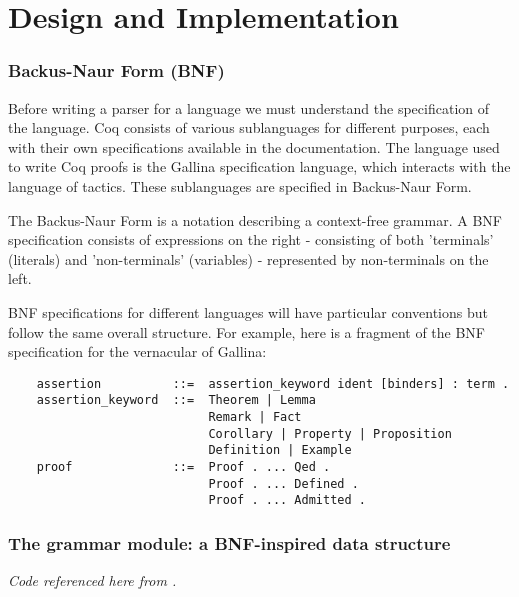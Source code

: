 \chapter{Design and Implementation} %


\label{design-and-implementation} %


\subsection{Backus-Naur Form (BNF)}

Before writing a parser for a language we must understand the specification of the language. Coq consists of various sublanguages for different purposes, each with their own specifications available in the documentation. The language used to write Coq proofs is the Gallina specification language, which interacts with the language of tactics. These sublanguages are specified in Backus-Naur Form.

The Backus-Naur Form is a notation describing a context-free grammar. A BNF specification consists of expressions on the right - consisting of both 'terminals' (literals) and 'non-terminals' (variables) - represented by non-terminals on the left.

BNF specifications for different languages will have particular conventions but follow the same overall structure.  For example, here is a fragment of the BNF specification for the vernacular of Gallina:

\begin{verbatim}
    assertion          ::=  assertion_keyword ident [binders] : term .
    assertion_keyword  ::=  Theorem | Lemma
                            Remark | Fact
                            Corollary | Property | Proposition
                            Definition | Example
    proof              ::=  Proof . ... Qed .
                            Proof . ... Defined .
                            Proof . ... Admitted .
\end{verbatim}
\subsection{The grammar module: a BNF-inspired data structure}
\emph{Code referenced here from .}

